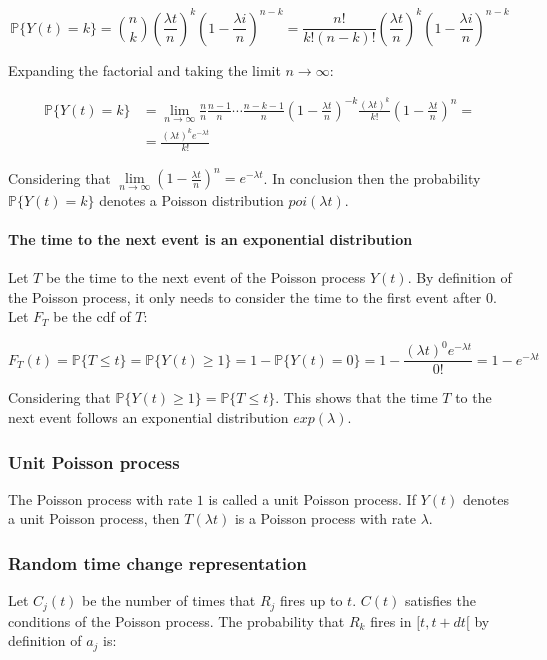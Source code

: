       $$\mathbb{P}\{Y(t) = k\} = \binom{n}{k}\left(\frac{\lambda t}{n}\right)^k\left(1-\frac{\lambda i}{n}\right)^{n-k} = \frac{n!}{k!(n-k)!}\left(\frac{\lambda t}{n}\right)^k\left(1-\frac{\lambda i}{n}\right)^{n-k}$$

      Expanding the factorial and taking the limit $n\rightarrow\infty$:

      \begin{align*}
        \mathbb{P}\{Y(t) = k\} &= \lim\limits_{n\rightarrow\infty}\frac{n}{n}\frac{n-1}{n}\cdots\frac{n-k-1}{n}\left(1-\frac{\lambda t}{n}\right)^{-k}\frac{(\lambda t)^k}{k!}\left(1-\frac{\lambda t}{n}\right)^n =\\
                               & = \frac{(\lambda t)^ke^{-\lambda t}}{k!}
      \end{align*}

      Considering that $\lim\limits_{n\rightarrow\infty} \left(1-\frac{\lambda t}{n}\right)^n = e^{-\lambda t}$.
      In conclusion then the probability $\mathbb{P}\{Y(t) =k\}$ denotes a Poisson distribution $poi(\lambda t)$.

      \paragraph{The time to the next event is an exponential distribution}
      Let $T$ be the time to the next event of the Poisson process $Y(t)$.
      By definition of the Poisson process, it only needs to consider the time to the first event after $0$.
      Let $F_T$ be the cdf of $T$:

      $$F_T(t) = \mathbb{P}\{T\le t\} = \mathbb{P}\{Y(t)\ge 1\} = 1-\mathbb{P}\{Y(t) = 0\} = 1-\frac{(\lambda t)^0e^{-\lambda t}}{0!} = 1-e^{-\lambda t}$$

      Considering that $\mathbb{P}\{Y(t)\ge 1\}=\mathbb{P}\{T\le t\}$.
      This shows that the time $T$ to the next event follows an exponential distribution $exp(\lambda)$.

    \subsubsection{Unit Poisson process}
    The Poisson process with rate $1$ is called a unit Poisson process.
    If $Y(t)$ denotes a unit Poisson process, then $T(\lambda t)$ is a Poisson process with rate $\lambda$.

    \subsubsection{Random time change representation}
    Let $C_j(t)$ be the number of times that $R_j$ fires up to $t$.
    $C(t)$ satisfies the conditions of the Poisson process.
    The probability that $R_k$ fires in $[t,t+dt[$ by definition of $a_j$ is:

